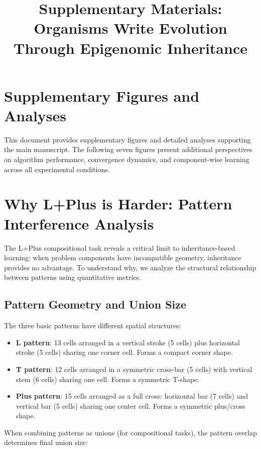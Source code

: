 \documentclass[12pt]{article}
\title{Supplementary Materials: \\
Organisms Write Evolution Through Epigenomic Inheritance}
\author{}
\date{}
\begin{document}
\maketitle

\section*{Supplementary Figures and Analyses}

This document provides supplementary figures and detailed analyses supporting the main manuscript. The following seven figures present additional perspectives on algorithm performance, convergence dynamics, and component-wise learning across all experimental conditions.

\newpage

\section*{Why L+Plus is Harder: Pattern Interference Analysis}

The L+Plus compositional task reveals a critical limit to inheritance-based learning: when problem components have incompatible geometry, inheritance provides no advantage. To understand why, we analyze the structural relationship between patterns using quantitative metrics.

\subsection*{Pattern Geometry and Union Size}

The three basic patterns have different spatial structures:
\begin{itemize}
\item \textbf{L pattern}: 13 cells arranged in a vertical stroke (5 cells) plus horizontal stroke (5 cells) sharing one corner cell. Forms a compact corner shape.
\item \textbf{T pattern}: 12 cells arranged in a symmetric cross-bar (5 cells) with vertical stem (6 cells) sharing one cell. Forms a symmetric T-shape.
\item \textbf{Plus pattern}: 15 cells arranged as a full cross: horizontal bar (7 cells) and vertical bar (5 cells) sharing one center cell. Forms a symmetric plus/cross shape.
\end{itemize}

When combining patterns as unions (for compositional tasks), the pattern overlap determines final union size:
\end{document}
